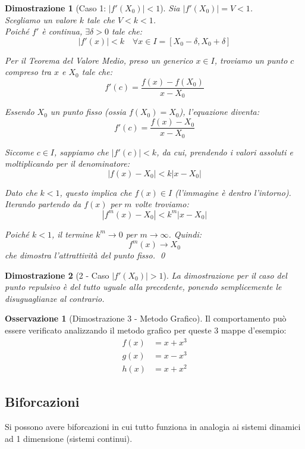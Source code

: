 \documentclass[openany]{book}
\newtheorem*{dimostrazione}{Dimostrazione}
\theoremstyle{definition}
\newtheorem*{osservazione}{Osservazione}
\theoremstyle{remark}
\begin{document}
\begin{dimostrazione}[Caso 1: $|f'(X_0)| < 1$]
Sia $|f'(X_0)| = V < 1$. \\
Scegliamo un valore $k$ tale che $V < k < 1$. \\
Poiché $f'$ è continua, $\exists \delta > 0$ tale che:
$$ |f'(x)| < k \quad \forall x \in I = [X_0 - \delta, X_0 + \delta] $$

Per il Teorema del Valore Medio, preso un generico $x \in I$, troviamo un punto $c$ compreso tra $x$ e $X_0$ tale che:
$$ f'(c) = \frac{f(x) - f(X_0)}{x - X_0} $$

Essendo $X_0$ un punto fisso (ossia $f(X_0) = X_0$), l'equazione diventa:
$$ f'(c) = \frac{f(x) - X_0}{x - X_0} $$

Siccome $c \in I$, sappiamo che $|f'(c)| < k$, da cui, prendendo i valori assoluti e moltiplicando per il denominatore:
$$ |f(x) - X_0| < k |x - X_0| $$

Dato che $k < 1$, questo implica che $f(x) \in I$ (l'immagine è dentro l'intorno). \\
Iterando partendo da $f(x)$ per $m$ volte troviamo:
$$ |f^m(x) - X_0| < k^m |x - X_0| $$

Poiché $k < 1$, il termine $k^m \to 0$ per $m \to \infty$. Quindi:
$$ f^m(x) \to X_0 $$
che dimostra l'attrattività del punto fisso. \qed
\end{dimostrazione}


\begin{dimostrazione}[2 - Caso $|f'(X_0)| > 1$]
La dimostrazione per il caso del punto repulsivo è del tutto uguale alla precedente, ponendo semplicemente le disuguaglianze al contrario.
\end{dimostrazione}

\begin{osservazione}[Dimostrazione 3 - Metodo Grafico]
Il comportamento può essere verificato analizzando il metodo grafico per queste 3 mappe d'esempio:
\begin{align*}
    f(x) &= x + x^3 \\
    g(x) &= x - x^3 \\
    h(x) &= x + x^2
\end{align*}
\end{osservazione}


\subsection{Biforcazioni}

Si possono avere biforcazioni in cui tutto funziona in analogia ai sistemi dinamici ad 1 dimensione (sistemi continui).
\end{document}
